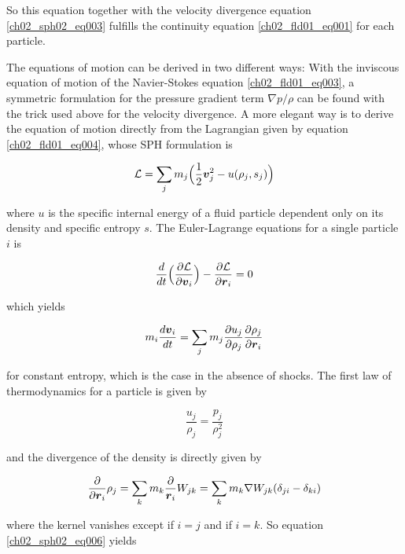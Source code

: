 So this equation together with the velocity divergence equation \ref{ch02_sph02_eq003} fulfills the continuity equation \ref{ch02_fld01_eq001} for each particle.

The equations of motion can be derived in two different ways: With the inviscous equation of motion of the Navier-Stokes equation \ref{ch02_fld01_eq003}, a symmetric formulation for the pressure gradient term $\nabla p / \rho$ can be found with the trick used above for the velocity divergence. 
A more elegant way is to derive the equation of motion directly from the Lagrangian given by equation \ref{ch02_fld01_eq004}, whose SPH formulation is

\begin{equation}
\label{ch02_sph02_eq004}
\mathcal{L} = \sum_{j} m_j \Big( \frac{1}{2} \boldsymbol{v}_j^2 - u(\rho_j, s_j) \Big) 
\end{equation}

where $u$ is the specific internal energy of a fluid particle dependent only on its density and specific entropy $s$. The Euler-Lagrange equations for a single particle $i$ is

\begin{equation}
\label{ch02_sph02_eq005}
\frac{d}{dt} \Big( \frac{\partial \mathcal{L}}{\partial \boldsymbol{v}_i} \Big) - \frac{\partial \mathcal{L}}{\partial \boldsymbol{r}_i} = 0
\end{equation}

which yields 

\begin{equation}
\label{ch02_sph02_eq006}
m_i \frac{d \boldsymbol{v}_i }{dt} = \sum_{j} m_j \frac{\partial u_j}{\partial \rho_j} \frac{\partial \rho_j}{\partial \boldsymbol{r}_i}
\end{equation}

for constant entropy, which is the case in the absence of shocks. The first law of thermodynamics for a particle is given by

\begin{equation}
\label{ch02_sph02_eq007}
\frac{u_j}{\rho_j} = \frac{p_j}{\rho_j^2}
\end{equation}

and the divergence of the density is directly given by

\begin{equation}
\label{ch02_sph02_eq008}
\frac{\partial }{\partial \boldsymbol{r}_i} \rho_j
= \sum_{k} m_k \frac{\partial}{\boldsymbol{r}_i} W_{jk} 
= \sum_{k} m_k \nabla W_{jk} ( \delta_{ji} - \delta_{ki})
\end{equation}

where the kernel vanishes except if $i = j$ and if $i = k$. So equation \ref{ch02_sph02_eq006} yields

